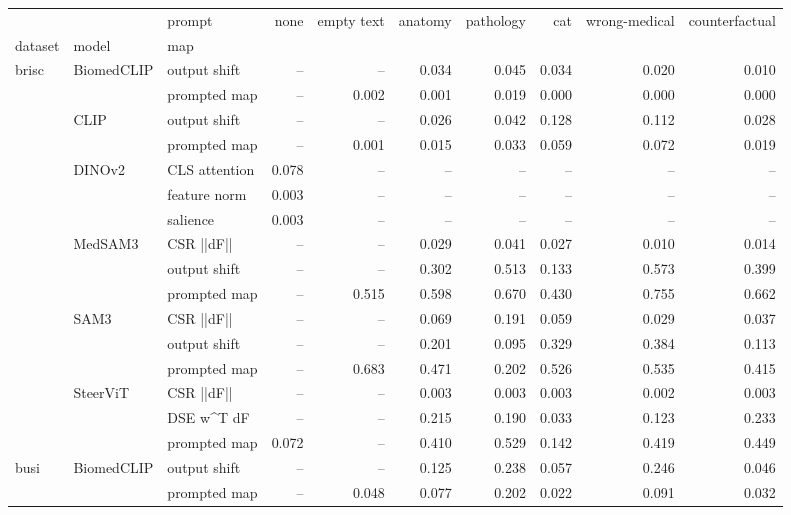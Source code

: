 \begin{tabular}{lllrrrrrrr}
\toprule
 &  & prompt & none & empty text & anatomy & pathology & cat & wrong-medical & counterfactual \\
dataset & model & map &  &  &  &  &  &  &  \\
\midrule
\multirow[t]{16}{*}{brisc} & \multirow[t]{2}{*}{BiomedCLIP} & output shift & -- & -- & 0.034 & 0.045 & 0.034 & 0.020 & 0.010 \\
 &  & prompted map & -- & 0.002 & 0.001 & 0.019 & 0.000 & 0.000 & 0.000 \\
\cline{2-10}
 & \multirow[t]{2}{*}{CLIP} & output shift & -- & -- & 0.026 & 0.042 & 0.128 & 0.112 & 0.028 \\
 &  & prompted map & -- & 0.001 & 0.015 & 0.033 & 0.059 & 0.072 & 0.019 \\
\cline{2-10}
 & \multirow[t]{3}{*}{DINOv2} & CLS attention & 0.078 & -- & -- & -- & -- & -- & -- \\
 &  & feature norm & 0.003 & -- & -- & -- & -- & -- & -- \\
 &  & salience & 0.003 & -- & -- & -- & -- & -- & -- \\
\cline{2-10}
 & \multirow[t]{3}{*}{MedSAM3} & CSR  ||dF|| & -- & -- & 0.029 & 0.041 & 0.027 & 0.010 & 0.014 \\
 &  & output shift & -- & -- & 0.302 & 0.513 & 0.133 & 0.573 & 0.399 \\
 &  & prompted map & -- & 0.515 & 0.598 & 0.670 & 0.430 & 0.755 & 0.662 \\
\cline{2-10}
 & \multirow[t]{3}{*}{SAM3} & CSR  ||dF|| & -- & -- & 0.069 & 0.191 & 0.059 & 0.029 & 0.037 \\
 &  & output shift & -- & -- & 0.201 & 0.095 & 0.329 & 0.384 & 0.113 \\
 &  & prompted map & -- & 0.683 & 0.471 & 0.202 & 0.526 & 0.535 & 0.415 \\
\cline{2-10}
 & \multirow[t]{3}{*}{SteerViT} & CSR  ||dF|| & -- & -- & 0.003 & 0.003 & 0.003 & 0.002 & 0.003 \\
 &  & DSE  w^T dF & -- & -- & 0.215 & 0.190 & 0.033 & 0.123 & 0.233 \\
 &  & prompted map & 0.072 & -- & 0.410 & 0.529 & 0.142 & 0.419 & 0.449 \\
\cline{1-10} \cline{2-10}
\multirow[t]{16}{*}{busi} & \multirow[t]{2}{*}{BiomedCLIP} & output shift & -- & -- & 0.125 & 0.238 & 0.057 & 0.246 & 0.046 \\
 &  & prompted map & -- & 0.048 & 0.077 & 0.202 & 0.022 & 0.091 & 0.032 \\

\end{tabular}
